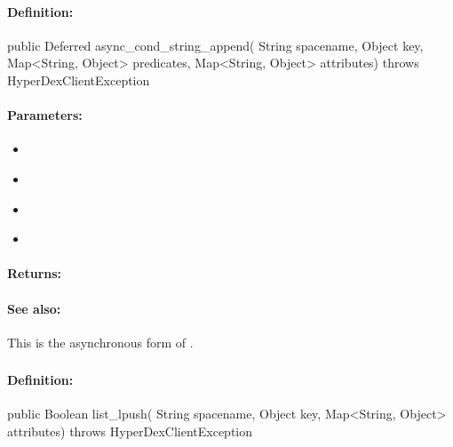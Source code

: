 \paragraph{Definition:}
\begin{javacode}
public Deferred async_cond_string_append(
        String spacename,
        Object key,
        Map<String, Object> predicates,
        Map<String, Object> attributes) throws HyperDexClientException
\end{javacode}

\paragraph{Parameters:}
\begin{itemize}[noitemsep]
\item {}\\

\item {}\\

\item {}\\

\item {}\\

\end{itemize}

\paragraph{Returns:}


\paragraph{See also:}  This is the asynchronous form of .

\pagebreak
\subsubsection{}
\label{api:java:list_lpush}


\paragraph{Definition:}
\begin{javacode}
public Boolean list_lpush(
        String spacename,
        Object key,
        Map<String, Object> attributes) throws HyperDexClientException
\end{javacode}

